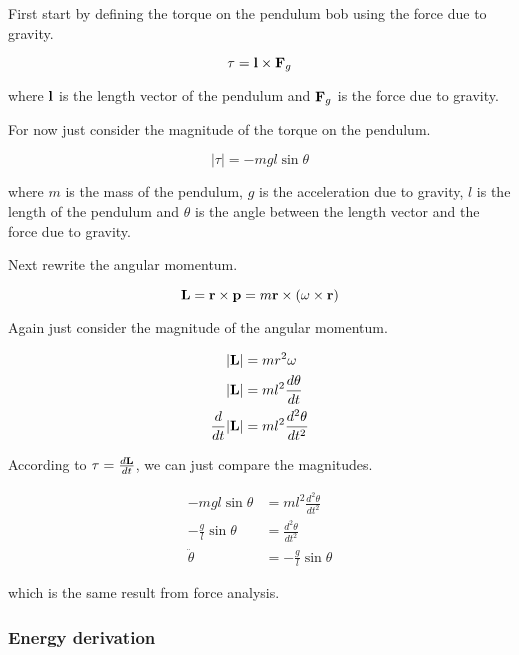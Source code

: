 First start by defining the torque on the pendulum bob using the force due to
gravity.

\begin{equation*}
  \mathbf{\tau} = \mathbf{l} \times \mathbf{F}_g
\end{equation*}

where $\mathbf{l}$ is the length vector of the pendulum and $\mathbf{F}_g$ is the
force due to gravity.

For now just consider the magnitude of the torque on the pendulum.

\begin{equation*}
  \lvert\tau\rvert = -mgl\sin\theta
\end{equation*}

where $m$ is the mass of the pendulum, $g$ is the acceleration due to gravity,
$l$ is the length of the pendulum and $\theta$ is the angle between the length
vector and the force due to gravity.

Next rewrite the angular momentum.

\begin{equation*}
  \mathbf{L} = \mathbf{r} \times \mathbf{p} =
    m\mathbf{r} \times (\mathbf{\omega} \times \mathbf{r})
\end{equation*}

Again just consider the magnitude of the angular momentum.

\begin{align*}
  \lvert\mathbf{L}\rvert &= mr^2\omega \\
  \lvert\mathbf{L}\rvert &= ml^2 \frac{d\theta}{dt} \\
  \frac{d}{dt}\lvert\mathbf{L}\rvert &= ml^2 \frac{d^2\theta}{dt^2}
\end{align*}

According to $\tau = \frac{d\mathbf{L}}{dt}$, we can just compare the magnitudes.

\begin{align*}
  -mgl\sin\theta &= ml^2\frac{d^2\theta}{dt^2} \\
  -\frac{g}{l}\sin\theta &= \frac{d^2\theta}{dt^2} \\
  \ddot{\theta} &= -\frac{g}{l}\sin\theta
\end{align*}

which is the same result from force analysis.

\subsubsection{Energy derivation}

